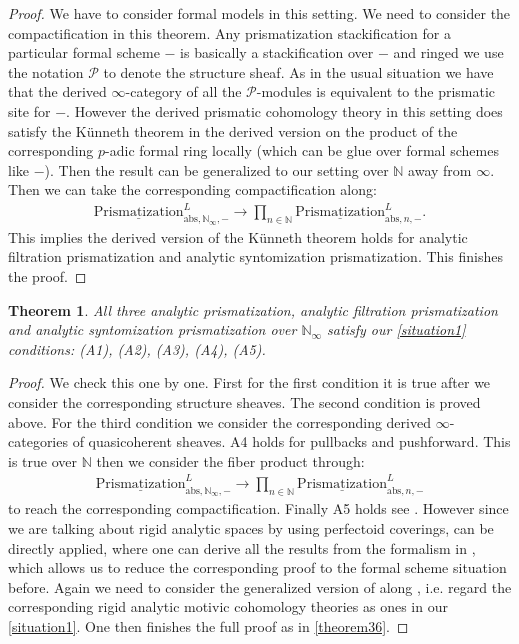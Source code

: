 \documentclass[12pt]{article}
\newtheorem{theorem}{Theorem}
\theoremstyle{definition}
\begin{document}
\begin{proof}
We have to consider formal models in this setting. We need to consider the compactification in this theorem. Any prismatization stackification for a particular formal scheme $-$ is basically a stackification over $-$ and ringed we use the notation $\mathcal{P}$ to denote the structure sheaf. As in the usual situation we have that the derived $\infty$-category of all the $\mathcal{P}$-modules is equivalent to the prismatic site for $-$. However the derived prismatic cohomology theory in this setting does satisfy the K\"unneth theorem in the derived version on the product of the corresponding $p$-adic formal ring locally (which can be glue over formal schemes like $-$). Then the result can be generalized to our setting over $\mathbb{N}$ away from $\infty$. Then we can take the corresponding compactification along:
\begin{align}
{\underline{\mathrm{Prismatization}}}^L_{\mathrm{abs},\mathbb{N}_\infty,-}\rightarrow  \prod_{n\in \mathbb{N}} {\underline{\mathrm{Prismatization}}}^L_{\mathrm{abs},n,-}.
\end{align}
This implies the derived version of the K\"unneth theorem holds for analytic filtration prismatization and analytic syntomization prismatization. This finishes the proof.
\end{proof}

\begin{theorem}
All three analytic prismatization, analytic filtration prismatization and analytic syntomization prismatization over $\mathbb{N}_\infty$ satisfy our \cref{situation1} conditions: (A1), (A2), (A3), (A4), (A5).
\end{theorem}


\begin{proof}
We check this one by one. First for the first condition it is true after we consider the corresponding structure sheaves. The second condition is proved above. For the third condition we consider the corresponding derived $\infty$-categories of quasicoherent sheaves. A4 holds for pullbacks and pushforward. This is true over $\mathbb{N}$ then we consider the fiber product through:
\begin{align}
{\underline{\mathrm{Prismatization}}}^L_{\mathrm{abs},\mathbb{N}_\infty,-}\rightarrow  \prod_{n\in \mathbb{N}} {\underline{\mathrm{Prismatization}}}^L_{\mathrm{abs},n,-}
\end{align}
to reach the corresponding compactification. Finally A5 holds see \cite[Chapter 4, in particular 4.7, 4.8, 4.9, 4.10]{3A}. However since we are talking about rigid analytic spaces by using perfectoid coverings, \cite{3A} can be directly applied, where one can derive all the results from the formalism in \cite{3A}, which allows us to reduce the corresponding proof to the formal scheme situation before. Again we need to consider the generalized version of \cite{3A} along \cite{3S}, i.e. regard the corresponding rigid analytic motivic cohomology theories as ones in our \cref{situation1}. One then finishes the full proof as in \cref{theorem36}.
\end{proof}
\end{document}
